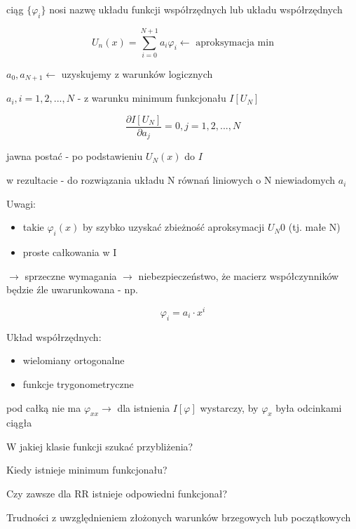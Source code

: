 ciąg $\{\varphi_i\}$ nosi nazwę układu funkcji współrzędnych lub układu współrzędnych

$$
U_n(x) = \sum_{i=0}^{N+1} a_i \varphi_i \leftarrow \text{ aproksymacja min}
$$

$a_0, a_{N+1} \leftarrow$ uzyskujemy z warunków logicznych

$a_i, i = 1,2, ... , N$ - z warunku minimum funkcjonału $I[U_N]$

$$
\frac{\partial I[U_N]}{\partial a_j} = 0, j = 1,2, ... , N
$$

jawna postać - po podstawieniu $U_N(x)$ do $I$

w rezultacie - do rozwiązania układu N równań liniowych o N niewiadomych $a_i$

Uwagi:

\begin{itemize}
	\item takie $\varphi_i(x)$ by szybko uzyskać zbieżność aproksymacji $U_N0$ (tj. małe N)
	\item proste całkowania w I
\end{itemize}

$\rightarrow$ sprzeczne wymagania
$\rightarrow$ niebezpieczeństwo, że macierz współczynników będzie źle uwarunkowana - np. 

$$
\varphi_i = a_i \cdot x^i
$$

Układ współrzędnych:

\begin{itemize}
	\item wielomiany ortogonalne
	\item funkcje trygonometryczne
\end{itemize}

pod całką nie ma $\varphi_{xx} \rightarrow$ dla istnienia $I[\varphi]$ wystarczy, by $\varphi_x$ była odcinkami ciągła

W jakiej klasie funkcji szukać przybliżenia?

Kiedy istnieje minimum funkcjonału?

Czy zawsze dla RR istnieje odpowiedni funkcjonał?

Trudności z uwzględnieniem złożonych warunków brzegowych lub początkowych